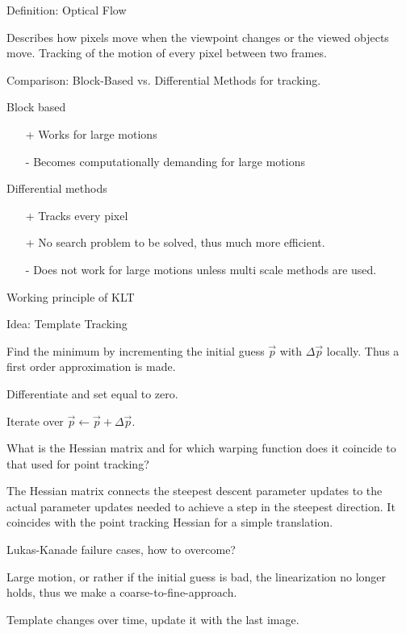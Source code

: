 \documentclass[10pt,a4paper]{scrartcl}
\begin{document}
\begin{multicols*}{2}
\begin{QandA}
{Definition: Optical Flow}
\item Describes how pixels move when the viewpoint changes or the viewed objects move. Tracking of the motion of every pixel between two frames.
\end{QandA}

\begin{QandA}
{Comparison: Block-Based vs. Differential Methods for tracking.}
\item Block based
\begin{itemize}
\item[+] Works for large motions
\item[-] Becomes computationally demanding for large motions
\end{itemize}
\item Differential methods
\begin{itemize}
\item[+] Tracks every pixel
\item[+] No search problem to be solved, thus much more efficient.
\item[-] Does not work for large motions unless multi scale methods are used.
\end{itemize}
\end{QandA}

\begin{QandA}
{Working principle of KLT}
\item Idea: Template Tracking
\item Find the minimum by incrementing the initial guess $\vec{p}$ with $\Delta \vec{p}$ locally. Thus a first order approximation is made.
\item Differentiate and set equal to zero.
\item Iterate over $\vec{p}\leftarrow \vec{p}+\Delta\vec{p}$.
\end{QandA}

\begin{QandA}
{What is the Hessian matrix and for which warping function does it coincide to that used for point tracking?}
\item The Hessian matrix connects the steepest descent parameter updates to the actual parameter updates needed to achieve a step in the steepest direction. It coincides with the point tracking Hessian for a simple translation.
\end{QandA}

\begin{QandA}
{Lukas-Kanade failure cases, how to overcome?}
\item Large motion, or rather if the initial guess is bad, the linearization no longer holds, thus we make a coarse-to-fine-approach.
\item Template changes over time, update it with the last image.
\end{QandA}


\end{multicols*}
\end{document}
